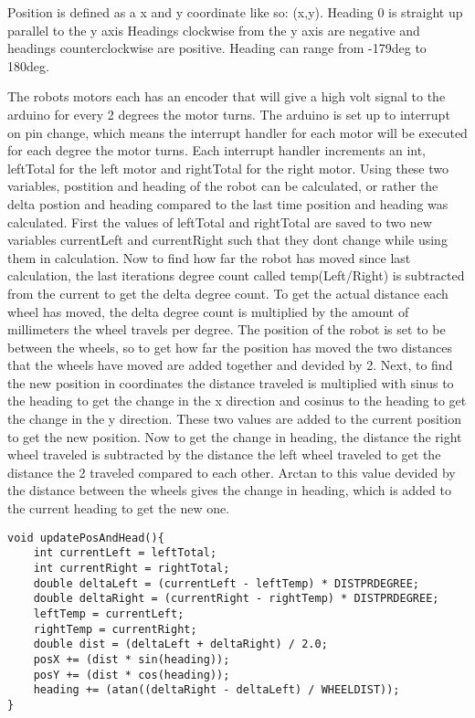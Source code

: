 Position is defined as a x and y coordinate like so: (x,y). \newline
Heading 0 is straight up parallel to the y axis \newline
Headings clockwise from the y axis are negative and headings counterclockwise are positive. \newline
Heading can range from -179deg to 180deg. \newline

The robots motors each has an encoder that will give a high volt signal to the arduino for every 2 degrees the motor turns. The arduino is set up to interrupt on pin change, which means the interrupt handler for each motor will be executed for each degree the motor turns. Each interrupt handler increments an int, leftTotal for the left motor and rightTotal for the right motor. \newline
Using these two variables, postition and heading of the robot can be calculated, or rather the delta postion and heading compared to the last time position and heading was calculated.
First the values of leftTotal and rightTotal are saved to two new variables currentLeft and currentRight such that they dont change while using them in calculation. Now to find how far the robot has moved since last calculation, the last iterations degree count called temp(Left/Right) is subtracted from the current to get the delta degree count. To get the actual distance each wheel has moved, the delta degree count is multiplied by the amount of millimeters the wheel travels per degree. The position of the robot is set to be between the wheels, so to get how far the position has moved the two distances that the wheels have moved are added together and devided by 2. Next, to find the new position in coordinates the distance traveled is multiplied with sinus to the heading to get the change in the x direction and cosinus to the heading to get the change in the y direction. These two values are added to the current position to get the new position. Now to get the change in heading, the distance the right wheel traveled is subtracted by the distance the left wheel traveled to get the distance the 2 traveled compared to each other. Arctan to this value devided by the distance between the wheels gives the change in heading, which is added to the current heading to get the new one.
\begin{lstlisting}[caption={updatePosAndHead function}, label={lst:upah}]
void updatePosAndHead(){
	int currentLeft = leftTotal;
	int currentRight = rightTotal;
	double deltaLeft = (currentLeft - leftTemp) * DISTPRDEGREE;
	double deltaRight = (currentRight - rightTemp) * DISTPRDEGREE;
	leftTemp = currentLeft;
	rightTemp = currentRight;
	double dist = (deltaLeft + deltaRight) / 2.0;
	posX += (dist * sin(heading));
	posY += (dist * cos(heading));
	heading += (atan((deltaRight - deltaLeft) / WHEELDIST));
}
\end{lstlisting}

